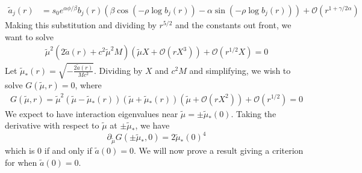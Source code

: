\documentclass[thesis.tex]{subfiles}
\begin{document}
\begin{align}\label{tildea1}
\tilde{a}_j(r) &= s_0 e^{\alpha \phi/\beta} b_j(r) \left( \beta \cos\left(-\rho \log b_j(r) \right) - \alpha \sin \left(-\rho \log b_j(r) \right) \right) + \mathcal{O}(r^{1+\gamma/2\alpha})
\end{align}
Making this substitution and dividing by $r^{5/2}$ and the constants out front, we want to solve
\begin{equation}\label{2detBint4}
\begin{aligned}
\tilde{\mu}^2 (2\tilde{a}(r) + c^2 \tilde{\mu}^2 M)\left( \tilde{\mu} X + \mathcal{O}(r X^3)\right) + \mathcal{O}( r^{1/2} X ) = 0
\end{aligned}
\end{equation}
Let $\tilde{\mu}_*(r) = \sqrt{-\frac{2\tilde{a}(r)}{M c^2}}$. Dividing by $X$ and $c^2 M$ and simplifying, we wish to solve $G(\tilde{\mu},r) = 0$, where
\begin{equation}\label{2detBint4}
\begin{aligned}
G(\tilde{\mu},r) = \tilde{\mu}^2 (\tilde{\mu} - \tilde{\mu}_*(r))(\tilde{\mu} + \tilde{\mu}_*(r))\left( \tilde{\mu} + \mathcal{O}(r X^2)\right) + \mathcal{O}( r^{1/2} ) = 0
\end{aligned}
\end{equation}
We expect to have interaction eigenvalues near $\tilde{\mu} = \pm \tilde{\mu}_*(0)$. Taking the derivative with respect to $\tilde{\mu}$ at $\pm \tilde{\mu}_*$, we have
\[
\partial_{\tilde{\mu}} G(\pm \tilde{\mu}_*,0) = 2 \tilde{\mu}_*(0)^4 
\]
which is 0 if and only if $\tilde{a}(0) = 0$. We will now prove a result giving a criterion for when $\tilde{a}(0) = 0$.
\end{document}
